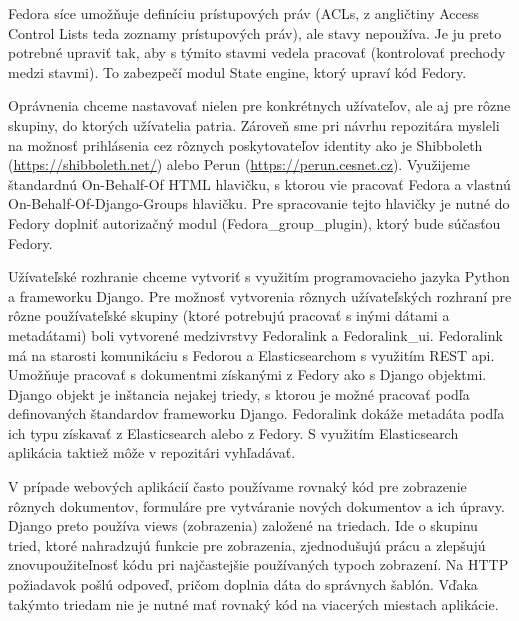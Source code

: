 \documentclass[thesis=M,slovak]{FITthesis}[2013/05/06]
\begin{document}
Fedora síce umožňuje definíciu prístupových práv (ACLs, z angličtiny Access Control Lists teda zoznamy prístupových práv), ale stavy nepoužíva. Je ju preto potrebné upraviť tak, aby s týmito stavmi vedela pracovať (kontrolovať prechody medzi stavmi). To zabezpečí modul State engine, ktorý upraví kód Fedory.

Oprávnenia chceme nastavovať nielen pre konkrétnych užívateľov, ale aj pre rôzne skupiny, do ktorých užívatelia patria. Zároveň sme pri návrhu repozitára mysleli na možnosť prihlásenia cez rôznych poskytovateľov identity ako je Shibboleth (\url{https://shibboleth.net/}) alebo Perun (\url{https://perun.cesnet.cz}). Využijeme štandardnú On-Behalf-Of HTML hlavičku, s ktorou vie pracovať Fedora a vlastnú On-Behalf-Of-Django-Groups hlavičku. Pre spracovanie tejto hlavičky je nutné do Fedory doplniť autorizačný modul (Fedora\_group\_plugin), ktorý bude súčasťou Fedory.

Užívateľské rozhranie chceme vytvoriť s využitím programovacieho jazyka Python a frameworku Django. Pre možnosť vytvorenia rôznych užívateľských rozhraní pre rôzne používateľské skupiny (ktoré potrebujú pracovať s inými dátami a metadátami) boli vytvorené medzivrstvy Fedoralink a Fedoralink\_ui. Fedoralink má na starosti komunikáciu s Fedorou a Elasticsearchom s využitím REST api. Umožňuje pracovať s dokumentmi získanými z Fedory ako s Django objektmi. Django objekt je inštancia nejakej triedy, s ktorou je možné pracovať podľa definovaných štandardov frameworku Django. Fedoralink dokáže metadáta podľa ich typu získavať z Elasticsearch alebo z Fedory. S využitím Elasticsearch aplikácia taktiež môže v repozitári vyhľadávať.

V prípade webových aplikácií často používame rovnaký kód pre zobrazenie rôznych dokumentov, formuláre pre vytváranie nových dokumentov a ich úpravy. Django preto používa views (zobrazenia) založené na triedach. Ide o skupinu tried, ktoré nahradzujú funkcie pre zobrazenia, zjednodušujú prácu a zlepšujú znovupoužiteľnosť kódu pri najčastejšie používaných typoch zobrazení. Na HTTP požiadavok pošlú odpoveď, pričom doplnia dáta do správnych šablón. Vďaka takýmto triedam nie je nutné mať rovnaký kód na viacerých miestach aplikácie.\cite{DjangoClassBasedViews}
\end{document}
